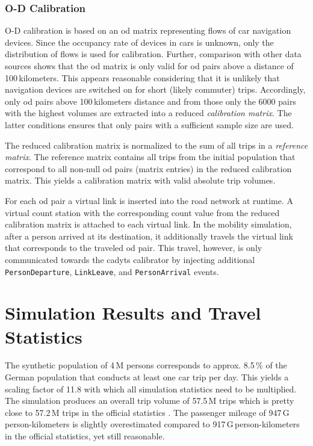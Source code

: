 \subsubsection{O-D Calibration}

O-D calibration is based on an \gls{od} matrix representing flows of car navigation devices. Since the occupancy rate of devices in cars is unknown, only the distribution of flows is used for calibration. Further, comparison with other data sources shows that the \gls{od} matrix is only valid for \gls{od} pairs above a distance of 100\,kilometers. This appears reasonable considering that it is unlikely that navigation devices are switched on for short (likely commuter) trips. Accordingly, only \gls{od} pairs above 100\,kilometers distance and from those only the 6000 pairs with the highest volumes are extracted into a reduced \emph{calibration matrix}. The latter conditions ensures that only pairs with a sufficient sample size are used.

The reduced calibration matrix is normalized to the sum of all trips in a \emph{reference matrix}. The reference matrix contains all trips from the initial population that correspond to all non-null \gls{od} pairs (matrix entries) in the reduced calibration matrix. This yields a calibration matrix with valid absolute trip volumes.

For each \gls{od} pair a virtual link is inserted into the road network at runtime. A virtual count station with the corresponding count value from the reduced calibration matrix is attached to each virtual link. In the mobility simulation, after a person arrived at its destination, it additionally travels the virtual link that corresponds to the traveled \gls{od} pair. This travel, however, is only communicated towards the \gls{cadyts} calibrator by injecting additional \lstinline|PersonDeparture|, \lstinline|LinkLeave|, and \lstinline|PersonArrival| events.

\section{Simulation Results and Travel Statistics}

The synthetic population of 4\,M persons corresponds to approx. 8.5\,\% of the German population that conducts at least one car trip per day. This yields a scaling factor of 11.8 with which all simulation statistics need to be multiplied. The simulation produces an overall trip volume of 57.5\,M trips which is pretty close to 57.2\,M trips in the official statistics \citep{DIW2014VerkehrInZahlen}. The passenger mileage of 947\,G\,person-kilometers is slightly overestimated compared to 917\,G\,person-kilometers in the official statistics, yet still reasonable.

